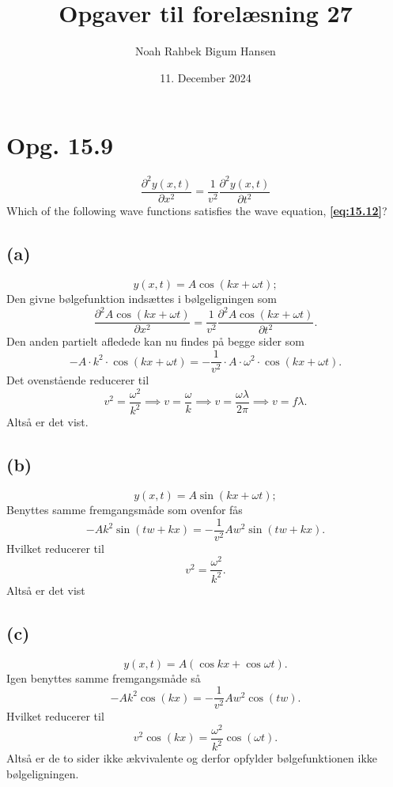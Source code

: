 \documentclass[12pt]{article}
\title{Opgaver til forelæsning 27}
\author{Noah Rahbek Bigum Hansen}
\date{11. December 2024}
\theoremstyle{definition}
\begin{document}
\maketitle

\section*{Opg. 15.9}
\begin{equation} \label{eq:15.12}
  \frac{\partial^2 y(x,t)}{\partial x^2} = \frac{1}{v^2} \frac{\partial^2 y(x,t)}{\partial t^2}
\end{equation}
Which of the following wave functions satisfies the wave equation, \textbf{\autoref{eq:15.12}}?

\subsection*{(a)}
\[ 
y(x,t) = A \cos(kx + \omega t)
;\]
\bigbreak
Den givne bølgefunktion indsættes i bølgeligningen som
\[ 
\frac{\partial^2 A \cos (kx + \omega t)}{\partial x^2} = \frac{1}{v^2} \frac{\partial^2 A \cos(kx + \omega t)}{\partial t^2}
.\]
Den anden partielt afledede kan nu findes på begge sider som
\[ 
- A \cdot k^2 \cdot \cos(kx + \omega t) = - \frac{1}{v^2} \cdot A\cdot \omega^2 \cdot \cos(kx + \omega t)
.\]
Det ovenstående reducerer til
\[ 
v^2 = \frac{\omega^2}{k^2} \implies v = \frac{\omega}{k} \implies v = \frac{\omega \lambda}{2\pi} \implies v = f\lambda
.\]
Altså er det vist.


\subsection*{(b)}
\[ 
y(x,t) = A \sin(kx + \omega t)
;\]
\bigbreak
Benyttes samme fremgangsmåde som ovenfor fås
\[ 
-A k^{2} \sin\left(t w + k x\right) = -\frac{1}{v^2} A w^{2} \sin\left(t w + k x\right)
.\]
Hvilket reducerer til
\[ 
v^2 = \frac{\omega^2}{k^2}
.\]
Altså er det vist

\subsection*{(c)}
\[ 
y(x,t) = A (\cos kx + \cos \omega t)
.\]
\bigbreak
Igen benyttes samme fremgangsmåde så
\[ 
-A k^{2} \cos\left(k x\right) = -\frac{1}{v^2} A w^{2} \cos\left(t w\right)
.\]
Hvilket reducerer til
\[ 
v^2 \cos(kx) = \frac{\omega^2}{k^2}\cos(\omega t)
.\]
Altså er de to sider ikke ækvivalente og derfor opfylder bølgefunktionen ikke bølgeligningen.
\end{document}
